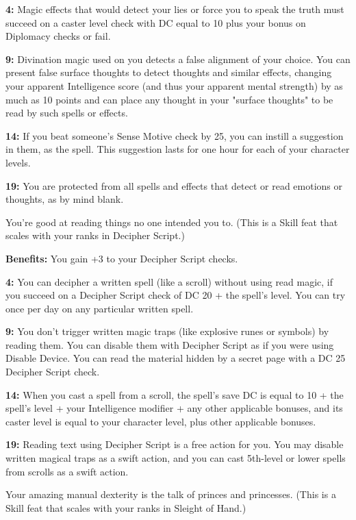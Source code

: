 \textbf{4:} Magic effects that would detect your lies or force you to speak the truth must succeed on a caster level check with DC equal to 10 plus your bonus on Diplomacy checks or fail.

\textbf{9:} Divination magic used on you detects a false alignment of your choice. You can present false surface thoughts to detect thoughts and similar effects, changing your apparent Intelligence score (and thus your apparent mental strength) by as much as 10 points and can place any thought in your "surface thoughts" to be read by such spells or effects.

\textbf{14:} If you beat someone's Sense Motive check by 25, you can instill a suggestion in them, as the spell. This suggestion lasts for one hour for each of your character levels.

\textbf{19:} You are protected from all spells and effects that detect or read emotions or thoughts, as by mind blank.


You're good at reading things no one intended you to. (This is a Skill feat that scales with your ranks in Decipher Script.)

\textbf{Benefits:} You gain +3 to your Decipher Script checks.

\textbf{4:} You can decipher a written spell (like a scroll) without using read magic, if you succeed on a Decipher Script check of DC 20 + the spell's level. You can try once per day on any particular written spell.

\textbf{9:} You don't trigger written magic traps (like explosive runes or symbols) by reading them. You can disable them with Decipher Script as if you were using Disable Device. You can read the material hidden by a secret page with a DC 25 Decipher Script check.

\textbf{14:} When you cast a spell from a scroll, the spell's save DC is equal to 10 + the spell's level + your Intelligence modifier + any other applicable bonuses, and its caster level is equal to your character level, plus other applicable bonuses.

\textbf{19:} Reading text using Decipher Script is a free action for you. You may disable written magical traps as a swift action, and you can cast 5th-level or lower spells from scrolls as a swift action.


Your amazing manual dexterity is the talk of princes and princesses. (This is a Skill feat that scales with your ranks in Sleight of Hand.)


